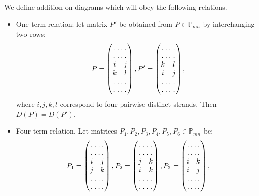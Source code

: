 \documentclass[12pt, a4paper, titlepage]{article}
\begin{document}
We define addition on diagrams which will obey the following relations. 
\begin{itemize}
  \item One-term relation:
let matrix $P'$ be obtained from $P\in \mathbb{P}_{mn}$ by interchanging two rows:
\begin{equation}\nonumber
P=\begin{pmatrix}\hdotsfor{2}\\ \hdotsfor{2}\\ i&j\\k&l \\ \hdotsfor{2}\\ \hdotsfor{2}\end{pmatrix},
P'=\begin{pmatrix}\hdotsfor{2}\\ \hdotsfor{2}\\ k&l\\ i&j\\ \hdotsfor{2}\\ \hdotsfor{2}\end{pmatrix},
\end{equation}
where $i,j,k,l$ correspond to four pairwise distinct strands.
Then $D(P)=D(P')$.
  \item Four-term relation.
Let matrices $P_1, P_2, P_3, P_4, P_5, P_6 \in \mathbb{P}_{mn}$ be:
\begin{equation}\nonumber
P_1=\begin{pmatrix}\hdotsfor{2}\\ \hdotsfor{2}\\ i&j\\j&k \\ \hdotsfor{2}\\ \hdotsfor{2}\end{pmatrix},
P_2=\begin{pmatrix}\hdotsfor{2}\\ \hdotsfor{2}\\ j&k\\i&k \\ \hdotsfor{2}\\ \hdotsfor{2}\end{pmatrix},
P_3=\begin{pmatrix}\hdotsfor{2}\\ \hdotsfor{2}\\ i&k\\i&j \\ \hdotsfor{2}\\ \hdotsfor{2}\end{pmatrix},
\end{equation}


\end{itemize}
\end{document}
